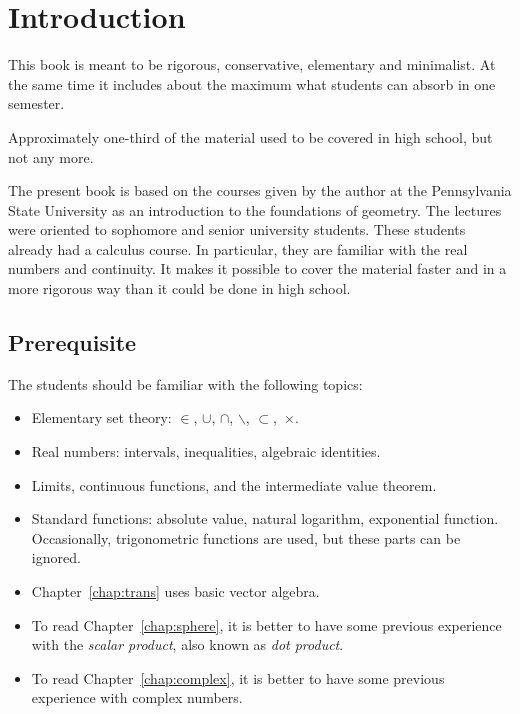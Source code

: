 \chapter*{Introduction}

This book is meant to be 
rigorous, 
conservative, 
elementary and
minimalist.
At the same time it includes about the maximum what students can absorb in one semester.

Approximately one-third of the material used to be covered in high school, but not any more.

The present book is based 
on the courses given by the author 
at the Pennsylvania State University
as an introduction to the foundations of geometry.
The lectures were oriented to sophomore and senior university students.  
These students already had a calculus course.
In particular, they are familiar with the real numbers and continuity.
It makes it possible to cover the material faster 
and  in a more rigorous way
than it could be done in high school.

\section*{Prerequisite}

The students should be familiar 
with the following topics:
\begin{itemize}
\item Elementary set theory: 
$\in$,
$\cup$, 
$\cap$,
$\backslash$,
$\subset$,~$\times$.
\item Real numbers: intervals, inequalities, algebraic identities.
\item Limits, continuous functions, and the intermediate value theorem.
\item Standard functions: 
absolute value, 
natural logarithm,
exponential function. 
Occasionally, trigonometric functions  are used, 
but these parts can be ignored.
\item  Chapter~\ref{chap:trans} uses basic vector algebra.
\item To read Chapter~\ref{chap:sphere}, it is better to have some previous experience with the {}\emph{scalar product}, also known as {}\emph{dot product}.
\item To read Chapter~\ref{chap:complex}, it is better to have some previous experience with complex numbers.
\end{itemize} 

